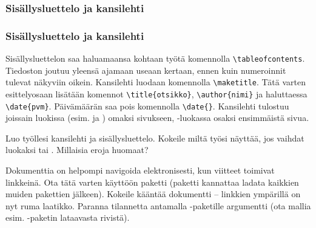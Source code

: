 \subsubsection{Sisällysluettelo ja kansilehti}
\begin{fframe}
    \frametitle{Sisällysluettelo ja kansilehti}
    Sisällysluettelon saa haluamaansa kohtaan työtä komennolla \lstinline-\tableofcontents-. Tiedoston joutuu yleensä ajamaan useaan kertaan, ennen kuin numeroinnit tulevat näkyviin oikein.
    \pause
    \vaihto
    Kansilehti luodaan komennolla \lstinline-\maketitle-. Tätä varten esittelyosaan lisätään komennot \lstinline-\title{otsikko}-, \lstinline-\author{nimi}- ja haluttaessa \lstinline-\date{pvm}-. Päivämäärän saa pois komennolla \lstinline-\date{}-.
    \vaihto
    Kansilehti tulostuu joissain luokissa (esim.  ja ) omaksi sivukseen, -luokassa osaksi ensimmäistä sivua.
\end{fframe}

\begin{fframe}
    \begin{harj}
        Luo työllesi kansilehti ja sisällysluettelo. Kokeile miltä työsi näyttää, jos vaihdat luokaksi  tai . Millaisia eroja huomaat? 
    \end{harj}
    \begin{harj}
        Dokumenttia on helpompi navigoida elektronisesti, kun viitteet toimivat linkkeinä. Ota tätä varten käyttöön paketti  (paketti kannattaa ladata kaikkien muiden pakettien jälkeen). Kokeile kääntää dokumentti -- linkkien ympärillä on nyt ruma laatikko. Paranna tilannetta antamalla -paketille argumentti  (ota mallia esim. -paketin lataavasta rivistä).
    \end{harj}
\end{fframe}

